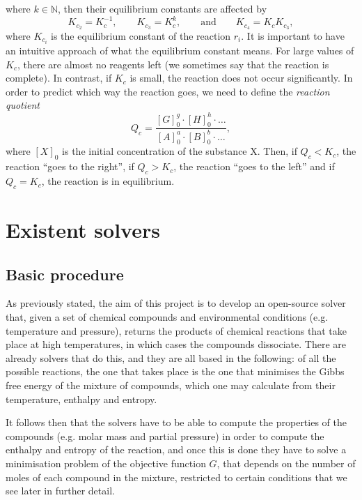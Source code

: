 \documentclass[a4paper,10pt]{article}
\newcommand{\mN}{{\mathbb N}}
\theoremstyle{plain}
\theoremstyle{definition}
\theoremstyle{remark}
\newcommand{\quotes}[1]{``#1''}
\begin{document}
where $k\in\mN$, then their equilibrium constants are affected by
\begin{equation}
K_{c_{2}} = K_c^{-1}, \qquad K_{c_{3}} = K_c^k, \qquad \text{and} \qquad K_{c_{4}} = K_c K_{c_{3}},
\end{equation}
where $K_{c_i}$ is the equilibrium constant of the reaction $r_i$.
It is important to have an intuitive approach of what the equilibrium constant means. For large values of $K_c$, there are almost no reagents left (we sometimes say that the reaction is complete). In contrast, if $K_c$ is small, the reaction does not occur significantly. In order to predict which way the reaction goes, we need to define the \textit{reaction quotient}
\begin{equation}
Q_c= \frac{[G]_0^g\cdot [H]_0^h\cdot\dots}{[A]_0^a\cdot [B]_0^b\cdot\dots},
\end{equation}
where $[X]_0$ is the initial concentration of the substance X. Then, if $Q_c<K_c$, the reaction \quotes{goes to the right}, if $Q_c>K_c$, the reaction \quotes{goes to the left} and if $Q_c=K_c$, the reaction is in equilibrium.
\section{Existent solvers}
\subsection{Basic procedure}
As previously stated, the aim of this project is to develop an open-source solver that, given a set of chemical compounds and environmental conditions (e.g. temperature and pressure), returns the products of chemical reactions that take place at high temperatures, in which cases the compounds dissociate. There are already solvers that do this, and they are all based in the following: of all the possible reactions, the one that takes place is the one that minimises the Gibbs free energy of the mixture of compounds, which one may calculate from their temperature, enthalpy and entropy.

It follows then that the solvers have to be able to compute the properties of the compounds (e.g. molar mass and partial pressure) in order to compute the enthalpy and entropy of the reaction, and once this is done they have to solve a minimisation problem of the objective function $G$, that depends on the number of moles of each compound in the mixture, restricted to certain conditions that we see later in further detail.
\end{document}

